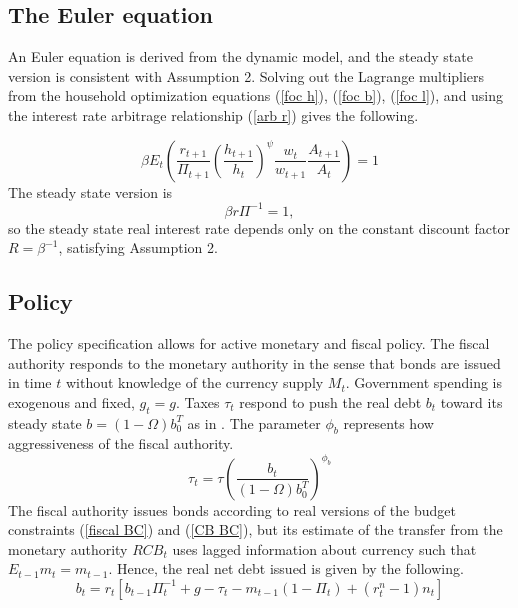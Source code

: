 \documentclass[]{article}
\begin{document}
\subsection{The Euler equation}

An Euler equation is derived from the dynamic model, and the steady state version is consistent with Assumption 2. Solving out the Lagrange multipliers from the household optimization equations (\ref{foc h}), (\ref{foc b}), (\ref{foc l}), and using the interest rate arbitrage relationship (\ref{arb r}) gives the following.

\begin{equation}
    \beta E_{t}\left(\frac{r_{t+1}}{\Pi_{t+1}}\left(\frac{h_{t+1}}{h_{t}}\right)^{\psi}\frac{w_{t}}{w_{t+1}}\frac{A_{t+1}}{A_{t}}\right)=1 
    \label{Euler}
\end{equation}
The steady state version is
\begin{equation}
    \beta r\Pi^{-1}=1, \label{Euler ss}
\end{equation}
so the steady state real interest rate depends only on the constant discount factor $R=\beta^{-1}$, satisfying Assumption 2.

\subsection{Policy}

The policy specification allows for active monetary and fiscal policy. The fiscal authority responds to the monetary authority in the sense that bonds are issued in time $t$ without knowledge of the currency supply $M_{t}$. Government spending is exogenous and fixed, $g_{t}=g$. Taxes $\tau_{t}$ respond to push the real debt $b_{t}$ toward its steady state $b=(1-\Omega)b_{0}^{T}$ as in \textcite{eusepi2018fiscal}. The parameter $\phi_{b}$ represents how aggressiveness of the fiscal authority.
\begin{equation}
    \tau_{t}=\tau\left(\frac{b_{t}}{(1-\Omega)b_{0}^{T}}\right)^{\phi_{b}}
    \label{tau}
\end{equation}
The fiscal authority issues bonds according to real versions of the budget constraints (\ref{fiscal BC}) and (\ref{CB BC}), but its estimate of the transfer from the monetary authority $RCB_{t}$ uses lagged information about currency such that $E_{t-1}m_{t}=m_{t-1}$. Hence, the real net debt issued is given by the following.
\begin{equation}
    b_{t}=r_{t}\left[b_{t-1}\Pi_{t}^{-1}+g-\tau_{t}-m_{t-1}(1-\Pi_{t})+(r^{n}_{t}-1)n_{t}\right]
    \label{b issue}
\end{equation}
\end{document}
